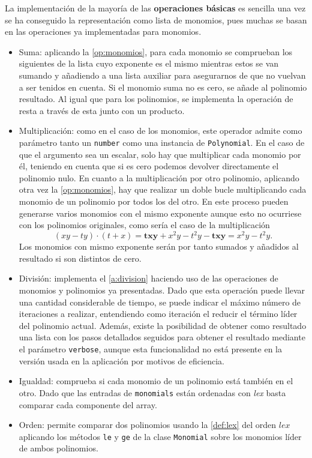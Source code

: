 La implementación de la mayoría de las \textbf{operaciones básicas} es sencilla una vez se ha conseguido la representación como lista de monomios, pues muchas se basan en las operaciones ya implementadas para monomios.
\begin{itemize}
    \item Suma: aplicando la \autoref{op:monomios}, para cada monomio se comprueban los siguientes de la lista cuyo exponente es el mismo mientras estos se van sumando y añadiendo a una lista auxiliar para asegurarnos de que no vuelvan a ser tenidos en cuenta. Si el monomio suma no es cero, se añade al polinomio resultado. Al igual que para los polinomios, se implementa la operación de resta a través de esta junto con un producto.
    \item Multiplicación: como en el caso de los monomios, este operador admite como parámetro tanto un \texttt{number} como una instancia de \texttt{Polynomial}. En el caso de que el argumento sea un escalar, solo hay que multiplicar cada monomio por él, teniendo en cuenta que si es cero podemos devolver directamente el polinomio nulo. En cuanto a la multiplicación por otro polinomio, aplicando otra vez la \autoref{op:monomios}, hay que realizar un doble bucle multiplicando cada monomio de un polinomio por todos los del otro. En este proceso pueden generarse varios monomios con el mismo exponente aunque esto no ocurriese con los polinomios originales, como sería el caso de la multiplicación
    $$(xy - ty)\cdot(t+x) = \boldsymbol{txy} + x^2y -t^2y - \boldsymbol{txy} = x^2y -t^2y.$$
    Los monomios con mismo exponente serán por tanto sumados y añadidos al resultado si son distintos de cero.
    \item División: implementa el \autoref{a:division} haciendo uso de las operaciones de monomios y polinomios ya presentadas. Dado que esta operación puede llevar una cantidad considerable de tiempo, se puede indicar el máximo número de iteraciones a realizar, entendiendo como iteración el reducir el término líder del polinomio actual. Además, existe la posibilidad de obtener como resultado una lista con los pasos detallados seguidos para obtener el resultado mediante el parámetro \texttt{verbose}, aunque esta funcionalidad no está presente en la versión usada en la aplicación por motivos de eficiencia.
    \item Igualdad: comprueba si cada monomio de un polinomio está también en el otro. Dado que las entradas de \texttt{monomials} están ordenadas con \textit{lex} basta comparar cada componente del array.
    \item Orden: permite comparar dos polinomios usando la \autoref{def:lex} del orden $lex$ aplicando los métodos \texttt{le} y \texttt{ge} de la clase \texttt{Monomial} sobre los monomios líder de ambos polinomios.

\end{itemize}
